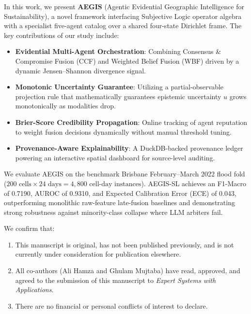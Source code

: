\documentclass[11pt,a4paper]{article}
\begin{document}
\vspace{0.6em}

\noindent In this work, we present \textbf{AEGIS} (Agentic Evidential Geographic Intelligence for Sustainability), a novel framework interfacing Subjective Logic operator algebra with a specialist five-agent catalog over a shared four-state Dirichlet frame. The key contributions of our study include:
\begin{itemize}
    \item \textbf{Evidential Multi-Agent Orchestration}: Combining Consensus \& Compromise Fusion (CCF) and Weighted Belief Fusion (WBF) driven by a dynamic Jensen--Shannon divergence signal.
    \item \textbf{Monotonic Uncertainty Guarantee}: Utilizing a partial-observable projection rule that mathematically guarantees epistemic uncertainty $u$ grows monotonically as modalities drop.
    \item \textbf{Brier-Score Credibility Propagation}: Online tracking of agent reputation to weight fusion decisions dynamically without manual threshold tuning.
    \item \textbf{Provenance-Aware Explainability}: A DuckDB-backed provenance ledger powering an interactive spatial dashboard for source-level auditing.
\end{itemize}

\vspace{0.6em}

\noindent We evaluate AEGIS on the benchmark Brisbane February--March 2022 flood fold ($200 \text{ cells} \times 24 \text{ days} = 4,800 \text{ cell-day instances}$). AEGIS-SL achieves an F1-Macro of 0.7190, AUROC of 0.9310, and Expected Calibration Error (ECE) of 0.043, outperforming monolithic raw-feature late-fusion baselines and demonstrating strong robustness against minority-class collapse where LLM arbiters fail.

\vspace{0.6em}

\noindent We confirm that:
\begin{enumerate}
    \item This manuscript is original, has not been published previously, and is not currently under consideration for publication elsewhere.
    \item All co-authors (Ali Hamza and Ghulam Mujtaba) have read, approved, and agreed to the submission of this manuscript to \textit{Expert Systems with Applications}.
    \item There are no financial or personal conflicts of interest to declare.
\end{enumerate}
\end{document}
